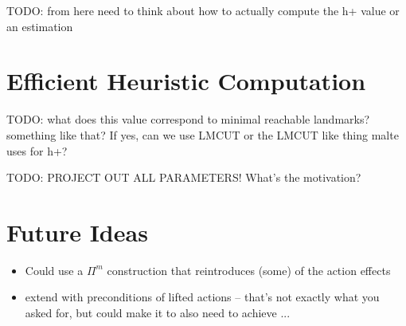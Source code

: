 \documentclass[twocolumn]{article}
\newcommand{\task}{\ensuremath{\Pi}\xspace}
\begin{document}
	
	TODO: from here need to think about how to actually compute the h+ value or an estimation
	
	
	\section{Efficient Heuristic Computation}
	
	TODO: what does this value correspond to minimal reachable landmarks? something like that? If yes, can we use LMCUT or the LMCUT like thing malte uses for h+?
	
	TODO: PROJECT OUT ALL PARAMETERS!
	What's the motivation?
	
	\section{Future Ideas}
	
	\begin{itemize}
		\item Could use a $\task^{m}$ construction that reintroduces (some) of the action effects
		\item extend with preconditions of lifted actions -- that's not exactly what you asked for, but could make it to also need to achieve ... 
	\end{itemize}
	
	
\end{document}
